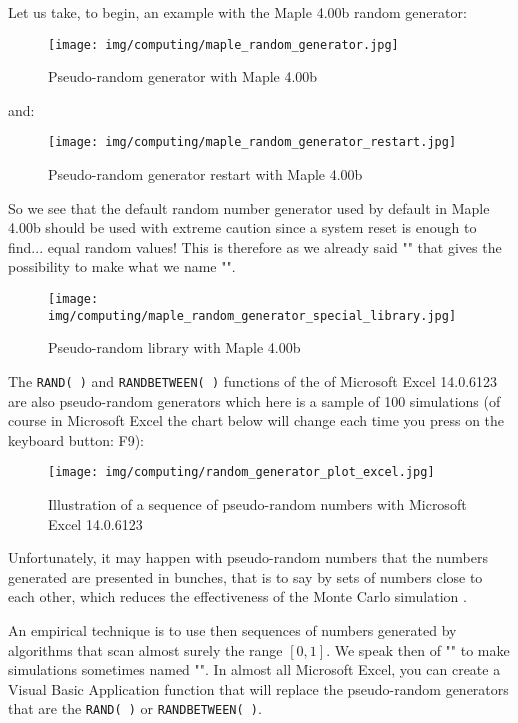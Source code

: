 	Let us take, to begin, an example with the Maple 4.00b random generator:
	\begin{figure}[H]
		\centering
		\texttt{[image: img/computing/maple\_random\_generator.jpg]}
		\caption{Pseudo-random generator with Maple 4.00b}
	\end{figure}
	and:
	\begin{figure}[H]
		\centering
		\texttt{[image: img/computing/maple\_random\_generator\_restart.jpg]}
		\caption[]{Pseudo-random generator restart with Maple 4.00b}
	\end{figure}
	So we see that the default random number generator used by default in Maple 4.00b should be used with extreme caution since a system reset is enough to find... equal random values! This is therefore as we already said "" that gives the possibility to make what we name "".
	\begin{figure}[H]
		\centering
		\texttt{[image: img/computing/maple\_random\_generator\_special\_library.jpg]}
		\caption[]{Pseudo-random library with Maple 4.00b}
	\end{figure}
	The \texttt{RAND( )} and \texttt{RANDBETWEEN( )} functions of the of Microsoft Excel 14.0.6123 are also pseudo-random generators which here is a sample of 100 simulations (of course in Microsoft Excel the chart below will change each time you press on the keyboard button: F9):
	\begin{figure}[H]
		\centering
		\texttt{[image: img/computing/random\_generator\_plot\_excel.jpg]}
		\caption[]{Illustration of a sequence of pseudo-random numbers with Microsoft Excel 14.0.6123}
	\end{figure}
	Unfortunately, it may happen with pseudo-random numbers that the numbers generated are presented in bunches, that is to say by sets of numbers close to each other, which reduces the effectiveness of the Monte Carlo simulation .

	An empirical technique is to use then sequences of numbers generated by algorithms that scan almost surely the range $[0,1]$. We speak then of "" to make simulations sometimes named "". In almost all Microsoft Excel, you can create a Visual Basic Application function that will replace the pseudo-random generators that are the \texttt{RAND( )} or \texttt{RANDBETWEEN( )}.

